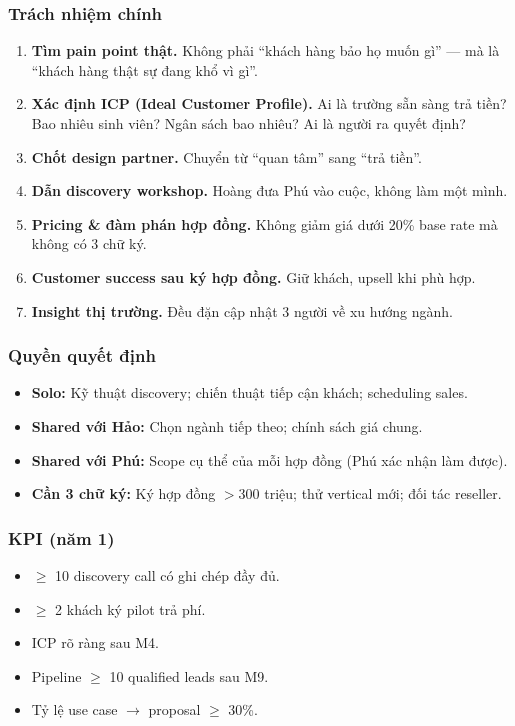\documentclass[11pt,a4paper]{article}
\begin{document}
\subsubsection*{Trách nhiệm chính}
\begin{enumerate}
\item \textbf{Tìm pain point thật.} Không phải ``khách hàng bảo họ muốn gì'' --- mà
là ``khách hàng thật sự đang khổ vì gì''.
\item \textbf{Xác định ICP (Ideal Customer Profile).} Ai là trường sẵn sàng trả
tiền? Bao nhiêu sinh viên? Ngân sách bao nhiêu? Ai là người ra quyết định?
\item \textbf{Chốt design partner.} Chuyển từ ``quan tâm'' sang ``trả tiền''.
\item \textbf{Dẫn discovery workshop.} Hoàng đưa Phú vào cuộc, không làm một mình.
\item \textbf{Pricing \& đàm phán hợp đồng.} Không giảm giá dưới 20\% base rate mà không có 3 chữ ký.
\item \textbf{Customer success sau ký hợp đồng.} Giữ khách, upsell khi phù hợp.
\item \textbf{Insight thị trường.} Đều đặn cập nhật 3 người về xu hướng ngành.
\end{enumerate}

\subsubsection*{Quyền quyết định}
\begin{itemize}
\item \textbf{Solo:} Kỹ thuật discovery; chiến thuật tiếp cận khách; scheduling sales.
\item \textbf{Shared với Hảo:} Chọn ngành tiếp theo; chính sách giá chung.
\item \textbf{Shared với Phú:} Scope cụ thể của mỗi hợp đồng (Phú xác nhận làm được).
\item \textbf{Cần 3 chữ ký:} Ký hợp đồng $>$300 triệu; thử vertical mới; đối tác reseller.
\end{itemize}

\subsubsection*{KPI (năm 1)}
\begin{itemize}
\item $\geq$ 10 discovery call có ghi chép đầy đủ.
\item $\geq$ 2 khách ký pilot trả phí.
\item ICP rõ ràng sau M4.
\item Pipeline $\geq$ 10 qualified leads sau M9.
\item Tỷ lệ use case $\to$ proposal $\geq$ 30\%.
\end{itemize}
\end{document}
